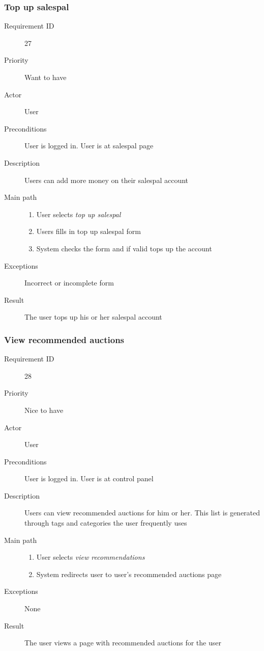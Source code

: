 		\subsubsection{Top up salespal}
			\begin{description}
				\item[Requirement ID] 27
				\item[Priority] Want to have
				\item[Actor] User
				\item[Preconditions] User is logged in. User is at salespal page
				\item[Description] Users can add more money on their salespal account
				\item[Main path]
 					\begin{enumerate}
						\item User selects \emph{top up salespal}
						\item Users fills in top up salespal form
						\item System checks the form and if valid tops up the account
					\end{enumerate}
				\item[Exceptions] Incorrect or incomplete form
				\item[Result] The user tops up his or her salespal account
			\end{description}
		\subsubsection{View recommended auctions}
			\begin{description}
				\item[Requirement ID] 28
				\item[Priority] Nice to have
				\item[Actor] User
				\item[Preconditions] User is logged in. User is at control panel
				\item[Description] Users can view recommended auctions for him or her. This list 
					is generated through tags and categories the user frequently uses
				\item[Main path]
 					\begin{enumerate}
						\item User selects \emph{view recommendations}
						\item System redirects user to user's recommended auctions page
					\end{enumerate}
				\item[Exceptions] None
				\item[Result] The user views a page with recommended auctions for the user
			\end{description}
